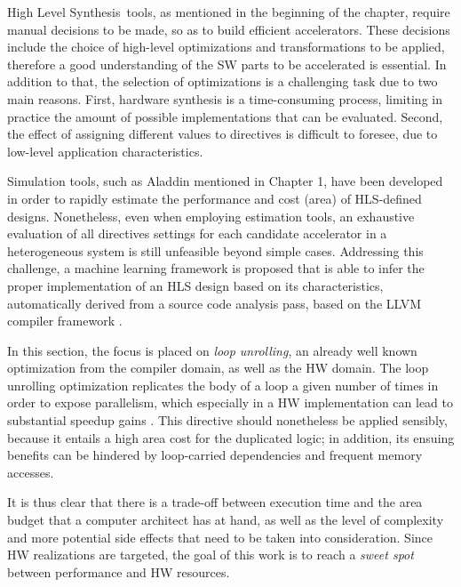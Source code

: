 \documentclass[]{usiinfthesis}
\newcommand{\HLS}{{High Level Synthesis}}
\begin{document}
\HLS\ tools, as mentioned in the beginning of the chapter, require manual decisions to be made, so as 
to build efficient accelerators. These decisions include the choice of high-level optimizations 
and transformations to be applied, therefore a good understanding of the SW parts to be 
accelerated is essential. 
In addition to that, 
the selection of optimizations is a challenging task due to two main reasons. 
First, hardware synthesis is a time-consuming process, limiting in practice the amount of 
possible implementations that can be evaluated. Second, the effect of assigning different values to 
directives is difficult to foresee, due to low-level application characteristics.\par

Simulation tools, such as Aladdin \cite{ShaoJul14} mentioned in Chapter 1, have been developed in order to rapidly estimate the performance and cost (area) of HLS-defined designs. Nonetheless, even when employing estimation tools, an exhaustive evaluation of all directives settings for each candidate accelerator 
in a heterogeneous system is still unfeasible beyond simple cases. Addressing
this challenge, a machine learning framework is proposed that is able to infer the proper 
implementation of an HLS design based on its characteristics, automatically derived from a source code 
analysis pass, based on the LLVM compiler framework \cite{LattnerMar04}.\par

In this section, the focus is placed on {\em loop unrolling}, an already 
well known optimization from the compiler domain, as well as the HW domain.
The loop unrolling optimization replicates the body of a loop a given number of times 
in order to expose parallelism, which especially in a HW implementation can lead to 
substantial speedup gains \cite{KurraApr07}. 
This directive should nonetheless be applied sensibly, because it entails a high area cost for the 
duplicated logic; in addition, its ensuing benefits can be hindered by loop-carried dependencies 
and frequent memory accesses.\par

It is thus clear that there is a trade-off between execution time and the area budget that 
a computer architect has at hand, as well as the level of complexity and more potential 
side effects that need to be taken into consideration. Since HW realizations are targeted, 
the goal of this work is to reach a {\em sweet spot} between performance and HW resources.\par
\end{document}
